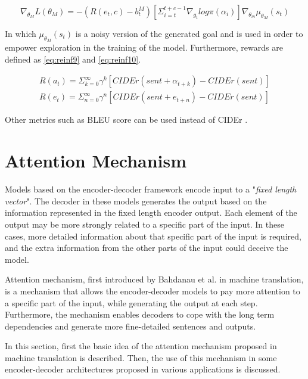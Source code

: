 \documentclass[preprint, 10pt]{elsarticle}
\begin{document}
		\begin{equation}
			\nabla_{\theta_M} L(\theta_M) = -(R(e_t, c) - b_t^M) [\Sigma_{i=t}^{t+c-1} \nabla_{g_t} log \pi(\alpha_i)] \nabla_{\theta_m} \mu_{\theta_M} (s_t)
			\label{eq:nabla}
		\end{equation}
		
		In which $\mu_{\theta_M} (s_t)$ is a noisy version of the generated goal and is used in order to empower exploration in the training of the model. Furthermore, rewards are defined as \eqref{eq:reinf9} and \eqref{eq:reinf10}.
		
		\begin{align}
			R(a_t) = \Sigma_{k=0}^\infty \gamma^k [CIDEr(sent + \alpha_{t+k}) - CIDEr(sent)] \label{eq:reinf9} \\
			R(e_t) = \Sigma_{n=0}^\infty \gamma^n [CIDEr(sent + e_{t+n}) - CIDEr(sent)] \label{eq:reinf10} 
		\end{align}
		
		Other metrics such as BLEU score can be used instead of CIDEr \cite{papineni2002bleu}.
		
	\section{Attention Mechanism}
		Models based on the encoder-decoder framework encode input to a "\textit{fixed length vector}". The decoder in these models generates the output based on the information represented in the fixed length encoder output. Each element of the output may be more strongly related to a specific part of the input. In these cases, more detailed information about that specific part of the input is required, and the extra information from the other parts of the input could deceive the model. 
		
		Attention mechanism, first introduced by Bahdanau et al. \cite{bahdanau2014neural} in machine translation, is a mechanism that allows the encoder-decoder models to pay more attention to a specific part of the input, while generating the output at each step. Furthermore, the mechanism enables decoders to cope with the long term dependencies and generate more fine-detailed sentences and outputs.
		
		In this section, first the basic idea of the attention mechanism proposed in machine translation is described. Then, the use of this mechanism in some encoder-decoder architectures proposed in various applications is discussed.
		
\end{document}
